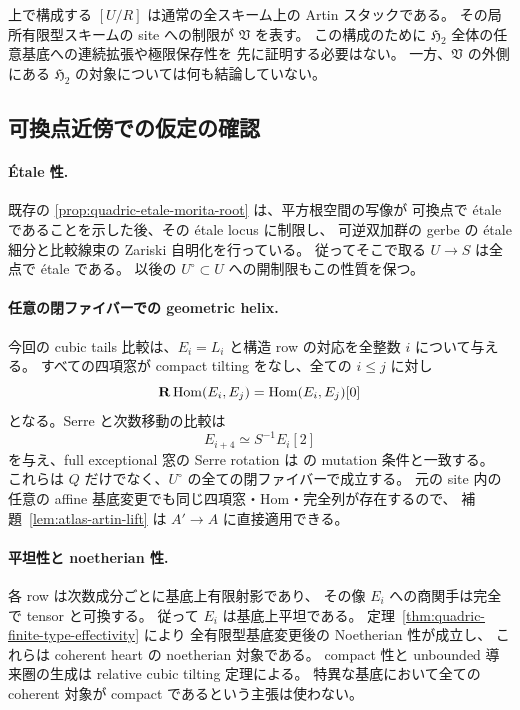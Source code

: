 \begin{remark}
上で構成する $[U/R]$ は通常の全スキーム上の Artin スタックである。
その局所有限型スキームの site への制限が $\mathfrak V$ を表す。
この構成のために $\mathfrak H_2$ 全体の任意基底への連続拡張や極限保存性を
先に証明する必要はない。
一方、$\mathfrak V$ の外側にある $\mathfrak H_2$ の対象については何も結論していない。
\end{remark}

\subsection{可換点近傍での仮定の確認}

\paragraph{\'Etale 性.}
既存の \ref{prop:quadric-etale-morita-root} は、平方根空間の写像が
可換点で \'etale であることを示した後、その \'etale locus に制限し、
可逆双加群の gerbe の \'etale 細分と比較線束の Zariski 自明化を行っている。
従ってそこで取る $U\to S$ は全点で \'etale である。
以後の $U^\circ\subset U$ への開制限もこの性質を保つ。

\paragraph{任意の閉ファイバーでの geometric helix.}
今回の cubic tails 比較は、$E_i=L_i$ と構造 row の対応を全整数 $i$ について与える。
すべての四項窓が compact tilting をなし、全ての $i\leq j$ に対し
\[
 \mathbf R\operatorname{Hom}(E_i,E_j)=\operatorname{Hom}(E_i,E_j)[0]
\]
となる。Serre と次数移動の比較は
\[
 E_{i+4}\simeq S^{-1}E_i[2]
\]
を与え、full exceptional 窓の Serre rotation は
\cite[Definition 5.12]{DeDekenLowen2011} の mutation 条件と一致する。
これらは $Q$ だけでなく、$U^\circ$ の全ての閉ファイバーで成立する。
元の site 内の任意の affine 基底変更でも同じ四項窓・Hom・完全列が存在するので、
補題~\ref{lem:atlas-artin-lift} は $A'\to A$ に直接適用できる。

\paragraph{平坦性と noetherian 性.}
各 row は次数成分ごとに基底上有限射影であり、
その像 $E_i$ への商関手は完全で tensor と可換する。
従って $E_i$ は基底上平坦である。
定理~\ref{thm:quadric-finite-type-effectivity} により
全有限型基底変更後の Noetherian 性が成立し、
これらは coherent heart の noetherian 対象である。
compact 性と unbounded 導来圏の生成は relative cubic tilting 定理による。
特異な基底において全ての coherent 対象が compact であるという主張は使わない。

